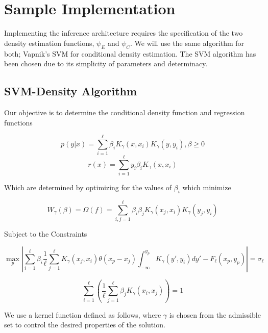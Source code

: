 \documentclass[10pt]{article}
\begin{document}
\section{Sample Implementation}
Implementing the inference architecture requires the specification of the two density estimation functions, \( \psi_E \) and \( \psi_C \).  We will use the same algorithm for both; Vapnik's SVM for conditional density estimation.  The SVM algorithm has been chosen due to its simplicity of parameters and determinacy. 

 
\subsection{SVM-Density Algorithm}

Our objective is to determine the conditional density function and regression functions

\begin{equation} p(y|x) = \sum_{i=1}^\ell \beta_i K_\gamma(x,x_i) K_\gamma(y,y_i) , \beta \ge 0 \end{equation}
\begin{equation} r(x) = \sum_{i=1}^\ell y_i \beta_i K_\gamma(x,x_i) \end{equation}

Which are determined by optimizing for the values of \( \beta_i \) which minimize

\begin{equation} W_\gamma(\beta) = \Omega(f) = \sum_{i,j=1}^\ell \beta_i \beta_j K_\gamma(x_j,x_i) K_\gamma(y_j,y_i) \end{equation}

Subject to the Constraints

\begin{equation} \max_p \left | \sum_{i=1}^\ell \beta_i \frac{1}{\ell} \sum_{j=1}^\ell K_\gamma(x_j,x_i)\theta(x_p-x_j) \int_{-\infty}^{y_p} K_\gamma(y',y_i)dy' - F_\ell(x_p,y_p) \right | = \sigma_\ell \end{equation}

\begin{equation} \sum_{i=1}^\ell \left ( \frac{1}{\ell} \sum_{j=1}^\ell \beta_j K_\gamma(x_i,x_j) \right ) = 1 \end{equation}

We use a kernel function defined as follows, where \( \gamma \) is chosen from the admissible set to control the desired properties of the solution.
\end{document}
